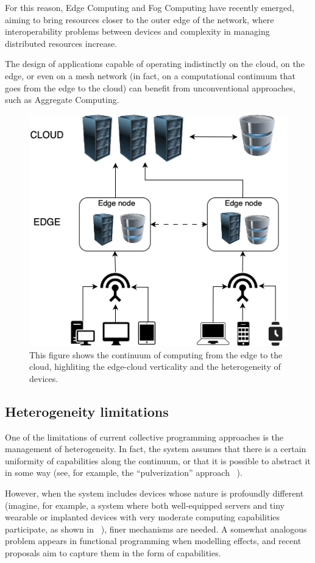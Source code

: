 For this reason, Edge Computing and Fog Computing have recently emerged, aiming to bring resources closer to the outer
edge of the network, where interoperability problems between devices and complexity in managing distributed resources increase.

The design of applications capable of operating indistinctly on the cloud, on the edge, or even on a mesh network
(in fact, on a computational continuum that goes from the edge to the cloud) can benefit from unconventional approaches,
such as Aggregate Computing.

\begin{figure}
    \centering
    \includegraphics[width=.5\linewidth]{figures/edgecloud}
    \caption{This figure shows the continuum of computing from the edge to the cloud, highliting the edge-cloud verticality
    and the heterogeneity of devices.}
    \label{fig:cloud-edge-continuum}
\end{figure}

\subsection{Heterogeneity limitations}
\label{subsec:heterogeneity-limitations}

One of the limitations of current collective programming approaches is the management of heterogeneity.
In fact, the system assumes that there is a certain uniformity of capabilities along the continuum, or that it is possible
to abstract it in some way (see, for example, the ``pulverization'' approach ~\cite{fi12110203}).

However, when the system includes devices whose nature is profoundly different (imagine, for example, a system where both
well-equipped servers and tiny wearable or implanted devices with very moderate computing capabilities participate, as
shown in ~), finer mechanisms are needed.
A somewhat analogous problem appears in functional programming when modelling effects, and recent proposals aim to capture
them in the form of capabilities.

